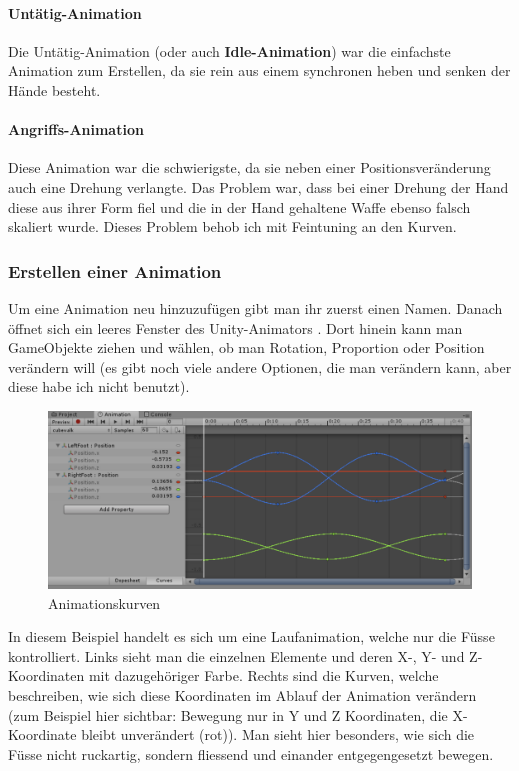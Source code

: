 \paragraph{Untätig-Animation}
Die Untätig-Animation (oder auch \textbf{Idle-Animation}) war die einfachste Animation zum Erstellen, da sie rein aus einem synchronen heben und senken der Hände besteht.

\paragraph{Angriffs-Animation}

Diese Animation war die schwierigste, da sie neben einer Positionsveränderung auch eine Drehung verlangte.
Das Problem war, dass bei einer Drehung der Hand diese aus ihrer Form fiel und die in der Hand gehaltene Waffe ebenso falsch skaliert wurde.
Dieses Problem behob ich mit Feintuning an den Kurven.


\subsubsection{Erstellen einer Animation}
Um eine Animation neu hinzuzufügen gibt man ihr zuerst einen Namen.
Danach öffnet sich ein leeres Fenster des Unity-Animators 
.
Dort hinein kann man GameObjekte ziehen und wählen, ob man Rotation, Proportion oder Position verändern will (es gibt noch viele andere Optionen, die man verändern 
kann, aber diese habe ich nicht benutzt).

\begin{figure}[H]
\includegraphics[scale=0.7]{screenshots/animations.png}
\caption{Animationskurven}
\end{figure}

In diesem Beispiel handelt es sich um eine Laufanimation, welche nur die Füsse kontrolliert. Links sieht man die einzelnen Elemente und deren X-, Y- und Z-Koordinaten mit dazugehöriger Farbe. Rechts sind die Kurven, welche beschreiben, wie sich diese Koordinaten im Ablauf der Animation verändern (zum Beispiel hier sichtbar: Bewegung nur in Y und Z Koordinaten, die X-Koordinate bleibt unverändert (rot)).
Man sieht hier besonders, wie sich die Füsse nicht ruckartig, sondern fliessend und einander entgegengesetzt bewegen.

